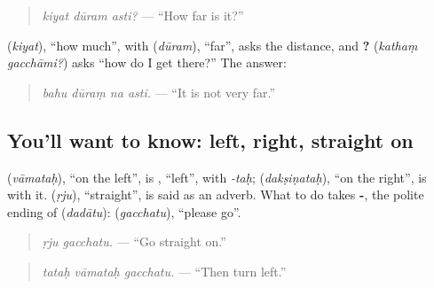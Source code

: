 \begin{quote}
\emph{kiyat dūram asti?} — \textquotedblleft{}How far is it?\textquotedblright{}
\end{quote}

\textbf{} (\emph{kiyat}), \textquotedblleft{}how much\textquotedblright{}, with \textbf{} (\emph{dūram}), \textquotedblleft{}far\textquotedblright{}, asks the distance, and \textbf{ ?} (\emph{kathaṃ gacchāmi?}) asks \textquotedblleft{}how do I get there?\textquotedblright{} The answer:

\begin{quote}
\textbf{   }
\end{quote}

\begin{quote}
\emph{bahu dūraṃ na asti.} — \textquotedblleft{}It is not very far.\textquotedblright{}
\end{quote}

\subsection*{You'll want to know: left, right, straight on}
\textbf{} (\emph{vāmataḥ}), \textquotedblleft{}on the left\textquotedblright{}, is \textbf{}, \textquotedblleft{}left\textquotedblright{}, with \emph{-taḥ}; \textbf{} (\emph{dakṣiṇataḥ}), \textquotedblleft{}on the right\textquotedblright{}, is \textbf{} with it. \textbf{} (\emph{ṛju}), \textquotedblleft{}straight\textquotedblright{}, is \textbf{} said as an adverb. What to do takes \textbf{-}, the polite ending of \textbf{} (\emph{dadātu}): \textbf{} (\emph{gacchatu}), \textquotedblleft{}please go\textquotedblright{}.

\begin{quote}
\textbf{ }
\end{quote}

\begin{quote}
\emph{ṛju gacchatu.} — \textquotedblleft{}Go straight on.\textquotedblright{}
\end{quote}

\begin{quote}
\textbf{  }
\end{quote}

\begin{quote}
\emph{tataḥ vāmataḥ gacchatu.} — \textquotedblleft{}Then turn left.\textquotedblright{}
\end{quote}

